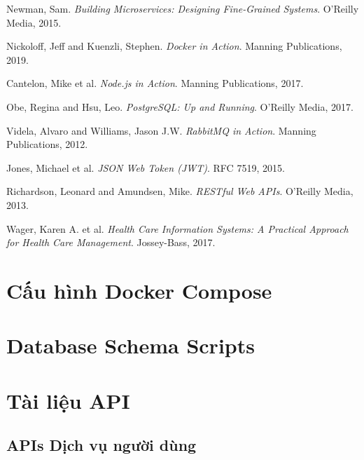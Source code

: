 \documentclass[12pt,a4paper]{report}
\begin{document}
    \begin{thebibliography}{99}

    Newman, Sam. \textit{Building Microservices: Designing Fine-Grained Systems}. O'Reilly Media, 2015.

    Nickoloff, Jeff and Kuenzli, Stephen. \textit{Docker in Action}. Manning Publications, 2019.

    Cantelon, Mike et al. \textit{Node.js in Action}. Manning Publications, 2017.

    Obe, Regina and Hsu, Leo. \textit{PostgreSQL: Up and Running}. O'Reilly Media, 2017.

    Videla, Alvaro and Williams, Jason J.W. \textit{RabbitMQ in Action}. Manning Publications, 2012.

    Jones, Michael et al. \textit{JSON Web Token (JWT)}. RFC 7519, 2015.

    Richardson, Leonard and Amundsen, Mike. \textit{RESTful Web APIs}. O'Reilly Media, 2013.

    Wager, Karen A. et al. \textit{Health Care Information Systems: A Practical Approach for Health Care Management}. Jossey-Bass, 2017.

    \end{thebibliography}

    \appendix

    \chapter{Cấu hình Docker Compose}

    \chapter{Database Schema Scripts}

    \chapter{Tài liệu API}
    \section{APIs Dịch vụ người dùng}
\end{document}
